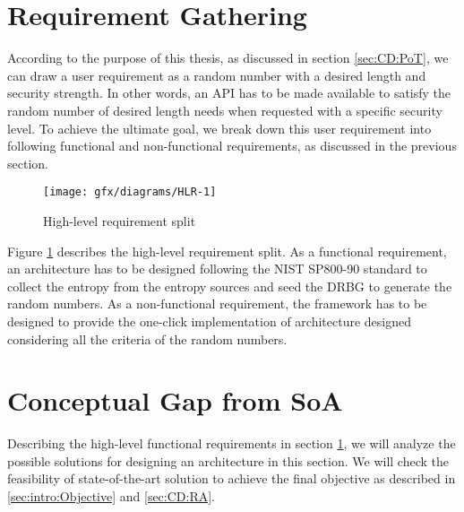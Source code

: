 %
%
\section{Requirement Gathering}
\label{sec:CD:HLR}

According to the purpose of this thesis, as discussed in section \ref{sec:CD:PoT}, we can draw a user requirement as a random number with a desired length and security strength. In other words, an API has to be made available to satisfy the random number of desired length needs when requested with a specific security level. To achieve the ultimate goal, we break down this user requirement into following functional and non-functional requirements, as discussed in the previous section.

\begin{figure}[!h]
	\centering
	\texttt{[image: gfx/diagrams/HLR-1]}
	\caption{High-level requirement split}
	\label{fig:4:1}
\end{figure}

Figure \ref{fig:4:1} describes the high-level requirement split. As a functional requirement, an architecture has to be designed following the NIST SP800-90 standard to collect the entropy from the entropy sources and seed the DRBG to generate the random numbers. As a non-functional requirement, the framework has to be designed to provide the one-click implementation of architecture designed considering all the criteria of the random numbers.

%
%
\section{Conceptual Gap from SoA}
\label{sec:CD:CG}
Describing the high-level functional requirements in section \ref{sec:CD:HLR}, we will analyze the possible solutions for designing an architecture in this section. We will check the feasibility of state-of-the-art solution to achieve the final objective as described in \ref{sec:intro:Objective} and \ref{sec:CD:RA}.  

